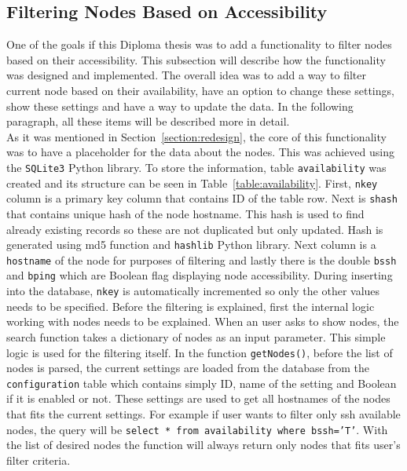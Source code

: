 {{{{\subsection{Filtering Nodes Based on Accessibility}
One of the goals if this Diploma thesis was to add a functionality to filter nodes based on their accessibility. This subsection will describe how the functionality was designed and implemented. The overall idea was to add a way to filter current node based on their availability, have an option to change these settings, show these settings and have a way to update the data. In the following paragraph, all these items will be described more in detail.\\
As it was mentioned in Section~\ref{section:redesign}, the core of this functionality was to have a placeholder for the data about the nodes. This was achieved using the \texttt{SQLite3} Python library. To store the information, table \texttt{availability} was created and its structure can be seen in Table~\ref{table:availability}. First, \texttt{nkey} column is a primary key column that contains ID of the table row. Next is \texttt{shash} that contains unique hash of the node hostname. This hash is used to find already existing records so these are not duplicated but only updated. Hash is generated using md5 function and \texttt{hashlib} Python library. Next column is a \texttt{hostname} of the node for purposes of filtering and lastly there is the double \texttt{bssh} and \texttt{bping} which are Boolean flag displaying node accessibility. During inserting into the database, \texttt{nkey} is automatically incremented so only the other values needs to be specified. Before the filtering is explained, first the internal logic working with nodes needs to be explained. When an user asks to show nodes, the search function takes a dictionary of nodes as an input parameter. This simple logic is used for the filtering itself. In the function \texttt{getNodes()}, before the list of nodes is parsed, the current settings are loaded from the database from the \texttt{configuration} table which contains simply ID, name of the setting and Boolean if it is enabled or not. These settings are used to get all hostnames of the nodes that fits the current settings. For example if user wants to filter only ssh available nodes, the query will be \texttt{select * from availability where bssh='T'}. With the list of desired nodes the function will always return only nodes that fits user's filter criteria.  \\

}}}}
